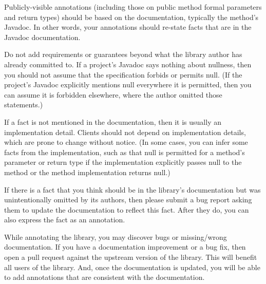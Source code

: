 
Publicly-visible annotations (including those on public method formal
parameters and return types) should be based on the
documentation, typically the method's Javadoc.
In other words, your annotations should re-state facts that are in the Javadoc
documentation.

Do not add requirements or guarantees beyond what the library author has
already committed to.  If a project's Javadoc says nothing about nullness,
then you should not assume that the specification forbids or permits null.
(If the project's Javadoc explicitly mentions null everywhere it is permitted,
then you can assume it is forbidden elsewhere, where the author omitted those
statements.)

If a fact is not mentioned in the documentation, then it is usually an
implementation detail.  Clients should not depend on implementation
details, which are prone to change without notice.
(In some cases, you can infer some facts from the
implementation, such as that null is permitted for a method's parameter or
return type if the implementation explicitly passes null to the method or
the method implementation returns null.)

If there is a fact that you think should be in the library's documentation
but was unintentionally omitted by its authors, then please submit a bug
report asking them to update the documentation to reflect this fact.  After
they do, you can also express the fact as an annotation.




While annotating the library, you may discover bugs or missing/wrong
documentation.  If you have a documentation improvement or a bug fix, then
open a pull request against the upstream version of the library.  This will
benefit all users of the library.  And, once the documentation is updated,
you will be able to add annotations that are consistent with the
documentation.



